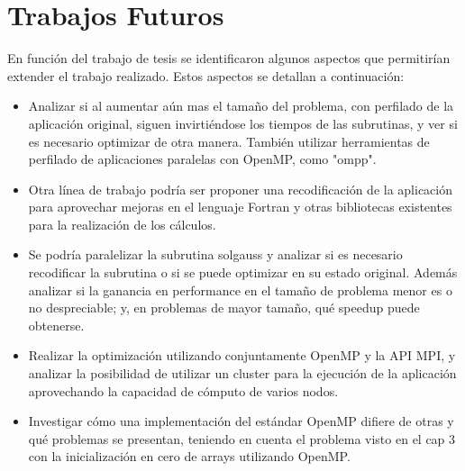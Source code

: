 \section{Trabajos Futuros}
En funci\'on del trabajo de tesis se identificaron algunos aspectos que permitir\'ian extender el trabajo realizado. Estos aspectos se detallan a continuaci\'on:
\begin{itemize}
\item Analizar si al aumentar a\'un mas el tama\~no del problema, con perfilado de la aplicaci\'on original, siguen invirti\'endose los tiempos de las subrutinas, y ver si es necesario optimizar de otra manera. Tambi\'en utilizar herramientas de perfilado de aplicaciones paralelas con OpenMP, como "ompp".
\item Otra l\'inea de trabajo podr\'ia ser proponer una recodificaci\'on de la aplicaci\'on para aprovechar mejoras en el lenguaje Fortran y otras bibliotecas existentes para la realizaci\'on de los c\'alculos.
\item Se podr\'ia paralelizar la subrutina solgauss y analizar si es necesario recodificar la subrutina o si se puede optimizar en su estado original. Adem\'as analizar si la ganancia en performance en el tama\~no de problema menor es o no despreciable; y, en problemas de mayor tama\~no, qu\'e speedup puede obtenerse.
\item Realizar la optimizaci\'on utilizando conjuntamente OpenMP y la API MPI, y analizar la posibilidad de utilizar un cluster para la ejecuci\'on de la aplicaci\'on aprovechando la capacidad de c\'omputo de varios nodos.
\item Investigar c\'omo una implementaci\'on del est\'andar OpenMP difiere de otras y qu\'e problemas se presentan, teniendo en cuenta el problema visto en el cap 3 con la inicializaci\'on en cero de arrays utilizando OpenMP.

\end{itemize}